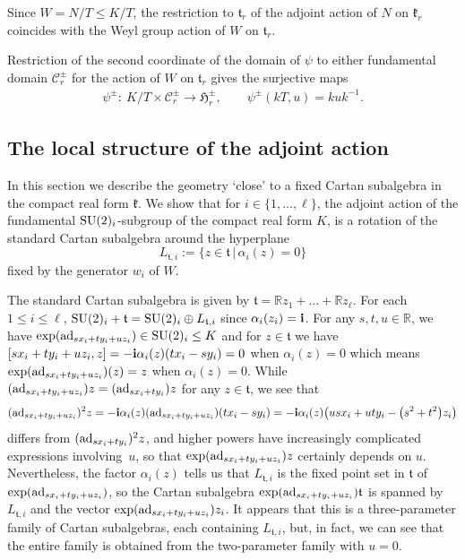 \documentclass[pdftex]{sigma}
\numberwithin{equation}{section}
\def\R{\mathbb{R}}
\def\a{\alpha}
\def\bi{{\bf i}}
\def\cC{\mathcal C}
\def\fH{\mathfrak{H}}
\def\k{\mathfrak{k}}
\def\ft{\mathfrak{t}}
\begin{document}
Since $W=N/T\leq K/T$, the restriction to $\ft_r$ of the adjoint action of $N$ on $\k_r$ coincides with the Weyl group action of $W$ on $\ft_r$.

Restriction of the second coordinate of the domain of $\psi$ to either fundamental domain $\cC_r^\pm$ for the action of $W$ on $\ft_r$ gives the surjective maps
\begin{gather*}
\psi^\pm\colon \ K/T\times \cC_r^\pm\longrightarrow \fH^\pm_r, \qquad \psi^\pm(kT,u) = kuk^{-1}.
\end{gather*}

\subsection{The local structure of the adjoint action}\label{section:localstructure}

In this section we describe the geometry `close' to a fixed Cartan subalgebra in the compact real form $\k$. We show that for $i\in \{1, \dots, {\ell}\}$, the adjoint action of the fundamental ${\rm SU}(2)_i$-subgroup of the compact real form $K$, is a rotation of the standard Cartan subalgebra around the hyperplane
\[L_{\ft,i}:=\{z\in \ft\, |\, \alpha_i(z)=0\}\]
fixed by the generator $w_i$ of $W$.

The standard Cartan subalgebra is given by $\ft= \R z_1 +\dots + \R z_{\ell}$.
For each $1\leq i \leq \ell$, ${\rm SU}(2)_i + \ft = {\rm SU}(2)_i \oplus L_{\ft,i}$ since $\a_i(z_i) = \bi$.
For any $s,t,u\in\R$, we have $\exp({\rm ad}_{sx_i+ty_i+uz_i})\in {\rm SU}(2)_i\leq K$ and for $z\in\ft$ we have
$ [sx_i+ty_i+uz_i,z] = -\bi\alpha_i(z) (tx_i-sy_i) = 0$ when $\alpha_i(z) = 0$ which means $\exp({\rm ad}_{sx_i+ty_i+uz_i})(z) = z$ when
$\alpha_i(z) = 0$. While $({\rm ad}_{sx_i+ty_i+uz_i})z = ({\rm ad}_{sx_i+ty_i})z$ for any $z\in\ft$, we see that
\begin{gather*} ({\rm ad}_{sx_i+ty_i+uz_i})^2 z = -\bi\alpha_i(z) ({\rm ad}_{sx_i+ty_i+uz_i})(tx_i-sy_i) = -\bi\alpha_i(z) \big(usx_i + uty_i - \big(s^2+t^2\big)z_i\big)
\end{gather*}
differs from $({\rm ad}_{sx_i+ty_i})^2 z$, and higher powers have increasingly complicated expressions involving~$u$, so that $\exp({\rm ad}_{sx_i+ty_i+uz_i})z$ certainly depends on $u$. Nevertheless, the factor $\alpha_i(z)$ tells us that $L_{\ft,i}$ is the fixed point set in $\ft$ of $\exp({\rm ad}_{sx_i+ty_i+uz_i})$, so the Cartan subalgebra $\exp({\rm ad}_{sx_i+ty_i+uz_i})\ft$ is
spanned by $L_{\ft,i}$ and the vector $\exp({\rm ad}_{sx_i+ty_i+uz_i})z_i$. It appears that this is a three-parameter family of Cartan subalgebras, each containing $L_{\ft,i}$, but, in fact, we can see that the entire family is obtained from the two-parameter family with $u = 0$.
\end{document}
